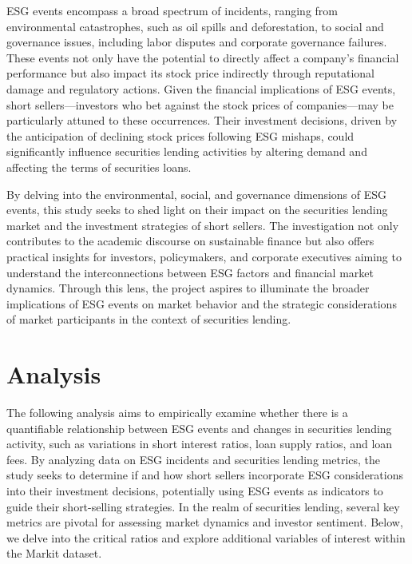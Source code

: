 ESG events encompass a broad spectrum of incidents, ranging from environmental catastrophes, such as oil spills and deforestation, to social and governance issues, including labor disputes and corporate governance failures. These events not only have the potential to directly affect a company's financial performance but also impact its stock price indirectly through reputational damage and regulatory actions. Given the financial implications of ESG events, short sellers—investors who bet against the stock prices of companies—may be particularly attuned to these occurrences. Their investment decisions, driven by the anticipation of declining stock prices following ESG mishaps, could significantly influence securities lending activities by altering demand and affecting the terms of securities loans.

By delving into the environmental, social, and governance dimensions of ESG events, this study seeks to shed light on their impact on the securities lending market and the investment strategies of short sellers. The investigation not only contributes to the academic discourse on sustainable finance but also offers practical insights for investors, policymakers, and corporate executives aiming to understand the interconnections between ESG factors and financial market dynamics. Through this lens, the project aspires to illuminate the broader implications of ESG events on market behavior and the strategic considerations of market participants in the context of securities lending.





%


\section{Analysis}

The following analysis aims to empirically examine whether there is a quantifiable relationship between ESG events and changes in securities lending activity, such as variations in short interest ratios, loan supply ratios, and loan fees. By analyzing data on ESG incidents and securities lending metrics, the study seeks to determine if and how short sellers incorporate ESG considerations into their investment decisions, potentially using ESG events as indicators to guide their short-selling strategies.  In the realm of securities lending, several key metrics are pivotal for assessing market dynamics and investor sentiment. Below, we delve into the critical ratios and explore additional variables of interest within the Markit dataset.

